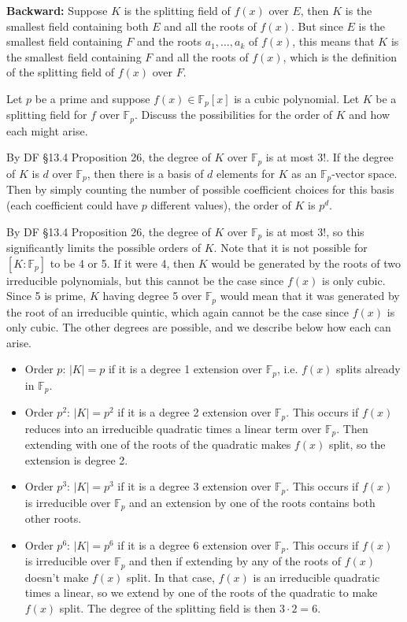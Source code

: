 \documentclass[10pt]{report}
\begin{document}
\textbf{Backward:} Suppose $K$ is the splitting field of $f(x)$ over $E$, then $K$ is the smallest field containing both $E$ and all the roots of $f(x)$. But since $E$ is the smallest field containing $F$ and the roots ${a}_1, \dots, {a}_{k}$ of $f(x)$, this means that $K$ is the smallest field containing $F$ and all the roots of $f(x)$, which is the definition of the splitting field of $f(x)$ over $F$.
\newpage

\begin{exer}[]
	Let $p$ be a prime and suppose $f(x)\in \mathbb{F}_{p}[x]$ is a cubic polynomial. Let $K$ be a splitting field for $f$ over $\mathbb{F}_{p}$. Discuss the possibilities for the order of $K$ and how each might arise.
\end{exer}
By DF \S 13.4 Proposition 26, the degree of $K$ over $\mathbb{F}_{p}$ is at most 3!. If the degree of $K$ is $d$ over $\mathbb{F}_{p}$, then there is a basis of $d$ elements for $K$ as an $\mathbb{F}_{p}$-vector space. Then by simply counting the number of possible coefficient choices for this basis (each coefficient could have $p$ different values), the order of $K$ is $p^d$.

By DF \S 13.4 Proposition 26, the degree of $K$ over $\mathbb{F}_{p}$ is at most 3!, so this significantly limits the possible orders of $K$. Note that it is not possible for $[K:\mathbb{F}_{p}]$ to be 4 or 5. If it were 4, then $K$ would be generated by the roots of two irreducible polynomials, but this cannot be the case since $f(x)$ is only cubic. Since 5 is prime, $K$ having degree 5 over $\mathbb{F}_{p}$ would mean that it was generated by the root of an irreducible quintic, which again cannot be the case since $f(x)$ is only cubic. The other degrees are possible, and we describe below how each can arise.

\begin{itemize}
	\item Order $p$: $|K|=p$ if it is a degree 1 extension over $\mathbb{F}_{p}$, i.e. $f(x)$ splits already in $\mathbb{F}_{p}$.
	\item Order $p^2$: $|K| = p^2$ if it is a degree 2 extension over $\mathbb{F}_{p}$. This occurs if $f(x)$ reduces into an irreducible quadratic times a linear term over $\mathbb{F}_{p}$. Then extending with one of the roots of the quadratic makes $f(x)$ split, so the extension is degree 2.
	\item Order $p^3$: $|K|=p^3$ if it is a degree 3 extension over $\mathbb{F}_{p}$. This occurs if $f(x)$ is irreducible over $\mathbb{F}_{p}$ and an extension by one of the roots contains both other roots.
	\item Order $p^6$: $|K|=p^6$ if it is a degree 6 extension over $\mathbb{F}_{p}$. This occurs if $f(x)$ is irreducible over $\mathbb{F}_{p}$ and then if extending by any of the roots of $f(x)$ doesn't make $f(x)$ split. In that case, $f(x)$ is an irreducible quadratic times a linear, so we extend by one of the roots of the quadratic to make $f(x)$ split. The degree of the splitting field is then $3 \cdot 2 = 6$.
\end{itemize}
\newpage
\end{document}
